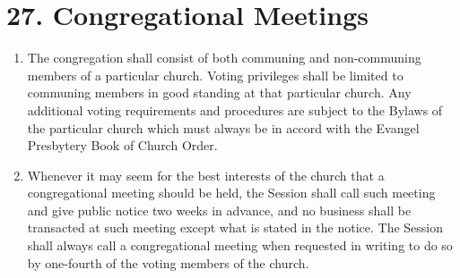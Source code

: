 \documentclass[
]{book}
\begin{document}
\hypertarget{congregational-meetings}{%
\section*{27. Congregational Meetings}\label{congregational-meetings}}

\protect\hypertarget{chapter-slug-27-congregational-meetings}{\href{}{}}

\begin{enumerate}
\def\labelenumi{\arabic{enumi}.}
\item
  \protect\hypertarget{27}{\href{}{}}The congregation shall consist of both communing and non-communing members of a particular church. Voting privileges shall be limited to communing members in good standing at that particular church. Any additional voting requirements and procedures are subject to the Bylaws of the particular church which must always be in accord with the Evangel Presbytery Book of Church Order.
\item
  Whenever it may seem for the best interests of the church that a congregational meeting should be held, the Session shall call such meeting and give public notice two weeks in advance, and no business shall be transacted at such meeting except what is stated in the notice. The Session shall always call a congregational meeting when requested in writing to do so by one-fourth of the voting members of the church.


\end{enumerate}
\end{document}
